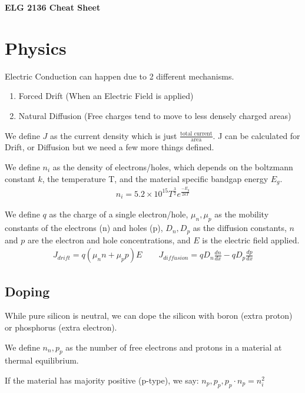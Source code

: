 \documentclass[12pt,letterpaper]{article} \usepackage{amsmath} \usepackage{graphicx} \usepackage[margin=1in]{geometry} \usepackage{longtable}  \usepackage{amssymb}
\begin{document}
	
	\begin{center}
		\Large\textbf{ELG 2136 Cheat Sheet} \\
		\vspace{0.5em}
	\end{center}	

	\section{Physics}
	Electric Conduction can happen due to 2 different mechanisms. 
	\begin{enumerate}[]	
		\item Forced Drift (When an Electric Field is applied)
		\item Natural Diffusion (Free charges tend to move to less densely charged areas)
	\end{enumerate}

	We define \textbf{$J$} as the current density which is just $\frac{\text{total current}}{\text {area}}$. J can be calculated for Drift, or Diffusion but we need a few more things defined. 
	
	We define $n_i$ as the density of electrons/holes, which depends on the boltzmann constant $k$, the temperature T, and the material specific bandgap energy $E_g$. 
	\begin{align*}
		n_i = 5.2\times 10^{15} T^{\frac{3}{2}} e^\frac{-E_g}{2kT}
	\end{align*}

	We define $q$ as the charge of a single electron/hole, $\mu_n, \mu_p$ as the mobility constants of the electrons (n) and holes (p), $D_n, D_p$ as the diffusion constants, $n$ and $p$ are the electron and hole concentrations, and $E$ is the electric field applied.
	\begin{align*}
		J_{drift} = q(\mu_n n+ \mu_p p) E \qquad J_{diffusion} = qD_n \frac{dn}{dx} - qD_p \frac{dp}{dx}
	\end{align*} 

	\subsection{Doping}
	While pure silicon is neutral, we can dope the silicon with boron (extra proton) or phosphorus (extra electron).
	
	We define $n_n, p_p$ as the number of free electrons and protons in a material at thermal equilibrium.
	
	If the material has majority positive (p-type), we say: $n_p, p_p, p_p\cdot n_p = n_i^2$
	
\end{document}
